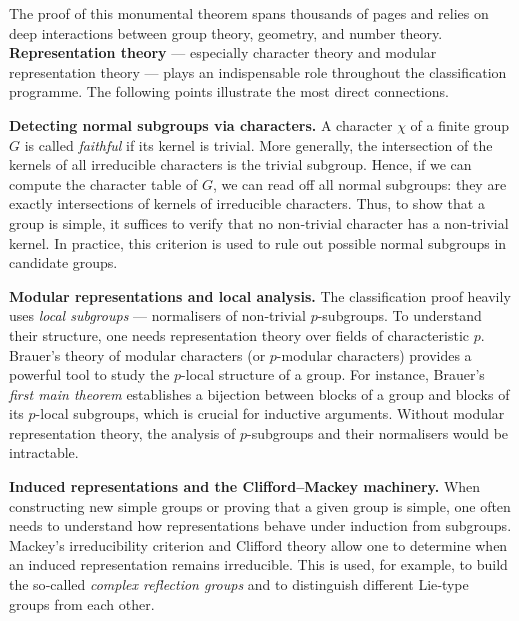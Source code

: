 The proof of this monumental theorem spans thousands of pages and relies on 
deep interactions between group theory, geometry, and number theory. 
\textbf{Representation theory} — especially character theory and modular 
representation theory — plays an indispensable role throughout the 
classification programme. The following points 
illustrate the most direct connections.

\medskip

\noindent \textbf{Detecting normal subgroups via characters.} 
A character $\chi$ of a finite group $G$ is called \emph{faithful} if its 
kernel is trivial. More generally, the intersection of the kernels of all 
irreducible characters is the trivial subgroup. Hence, if we can compute 
the character table of $G$, we can read off all normal subgroups: they are 
exactly intersections of kernels of irreducible characters. Thus, to show 
that a group is simple, it suffices to verify that no non‑trivial character 
has a non‑trivial kernel. In practice, this criterion is used to rule out 
possible normal subgroups in candidate groups.

\medskip

\noindent \textbf{Modular representations and local analysis.} 
The classification proof heavily uses \emph{local subgroups} — normalisers 
of non‑trivial $p$-subgroups. To understand their structure, one needs 
representation theory over fields of characteristic $p$. Brauer's theory of 
modular characters (or $p$-modular characters) provides a powerful tool to 
study the $p$-local structure of a group. For instance, Brauer's 
\emph{first main theorem} establishes a bijection between blocks of a group 
and blocks of its $p$-local subgroups, which is crucial for inductive 
arguments. Without modular representation theory, the analysis of 
$p$-subgroups and their normalisers would be intractable.

\medskip

\noindent \textbf{Induced representations and the Clifford–Mackey machinery.} 
When constructing new simple groups or proving that a given group is 
simple, one often needs to understand how representations behave under 
induction from subgroups. Mackey's irreducibility criterion and Clifford 
theory allow one to determine when an induced representation remains 
irreducible. This is used, for example, to build the so‐called 
\emph{complex reflection groups} and to distinguish different Lie‑type 
groups from each other.

\medskip

